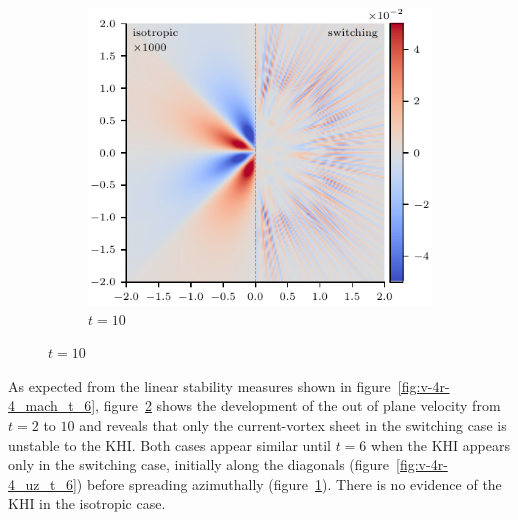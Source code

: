 \begin{figure}[t]
    \begin{subfigure}{0.32\textwidth}
      \includegraphics[width=\linewidth]{v-4r-4_uz_t_10}
      \caption{$t=10$}
      \label{fig:v-4r-4_uz_t_10}
    \end{subfigure}
\label{fig:out_of_plane_velocity}%
\end{figure}

As expected from the linear stability measures shown in figure~\ref{fig:v-4r-4_mach_t_6}, figure~\ref{fig:out_of_plane_velocity} shows the development of the out of plane velocity from $t=2$ to $10$ and reveals that only the current-vortex sheet in the switching case is unstable to the KHI. Both cases appear similar until $t=6$ when the KHI appears only in the switching case, initially along the diagonals (figure~\ref{fig:v-4r-4_uz_t_6}) before spreading azimuthally (figure~\ref{fig:v-4r-4_uz_t_10}). There is no evidence of the KHI in the isotropic case.

